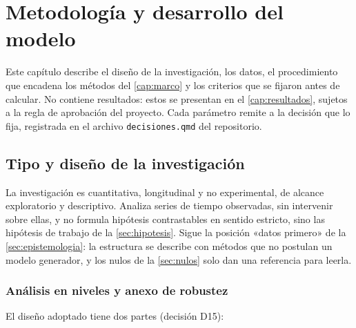 \chapter{Metodología y desarrollo del modelo}
\label{cap:metodologia}

Este capítulo describe el diseño de la investigación, los datos, el procedimiento que encadena los
métodos del \cref{cap:marco} y los criterios que se fijaron antes de calcular. No contiene
resultados: estos se presentan en el \cref{cap:resultados}, sujetos a la regla de aprobación del
proyecto. Cada parámetro remite a la decisión que lo fija, registrada en el archivo
\texttt{decisiones.qmd} del repositorio.

\section{Tipo y diseño de la investigación}
\label{sec:met-diseno}

La investigación es cuantitativa, longitudinal y no experimental, de alcance exploratorio y
descriptivo. Analiza series de tiempo observadas, sin intervenir sobre ellas, y no formula
hipótesis contrastables en sentido estricto, sino las hipótesis de trabajo de la
\cref{sec:hipotesis}. Sigue la posición «datos primero» de la \cref{sec:epistemologia}: la
estructura se describe con métodos que no postulan un modelo generador, y los nulos de la
\cref{sec:nulos} solo dan una referencia para leerla.

\subsection{Análisis en niveles y anexo de robustez}

El diseño adoptado tiene dos partes (decisión D15):

